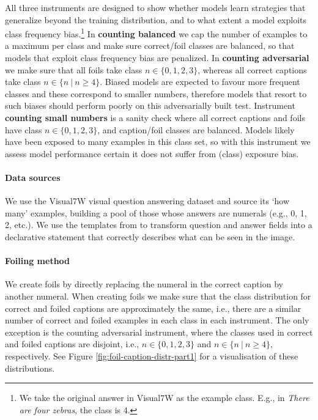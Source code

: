\documentclass[11pt]{article}
\newcommand\given[1][]{\:#1\vert\:}
\begin{document}
All three instruments are designed to show whether models learn strategies that generalize beyond the training distribution, and to what extent a model exploits class frequency bias.\footnote{We take the original answer in Visual7W as the example class. E.g., in \textit{There are four zebras}, the class is 4.}
In {\bf counting balanced} we cap the number of examples to a maximum per class and make sure correct/foil classes are balanced, so that models that exploit class frequency bias are penalized.
In {\bf counting adversarial} we make sure that all foils take class $n \in \{0,1,2,3\}$, whereas all correct captions take class $n \in \{n \given n \geq 4\}$. Biased models are expected to favour more frequent classes and these correspond to smaller numbers, therefore models that resort to such biases should perform poorly on this adversarially built test.
Instrument {\bf counting small numbers} is a sanity check where all correct captions and foils have class $n \in \{0,1,2,3\}$, and caption/foil classes are balanced. Models likely have been exposed to many examples in this class set, so with this instrument we assess model performance certain it does not suffer from (class) exposure bias.









\paragraph{Data sources}
We use the Visual7W visual question answering dataset \citep{zhu2016cvpr} and source its `how many' examples, building a pool of those whose answers are numerals (e.g., 0, 1, 2, etc.).
We use the templates from \citet{parcalabescu2021seeing} to transform question and answer fields into a declarative statement that correctly describes what can be seen in the image.




\paragraph{Foiling method}
We create foils by directly replacing the numeral in the correct caption by another numeral. When creating foils we make sure that the class distribution for correct and foiled captions are approximately the same, i.e., there are a similar number of correct and foiled examples in each class in each instrument.
The only exception is the counting adversarial instrument, where the classes used in correct and foiled captions are disjoint, i.e., $n \in \{0,1,2,3\}$ and $n \in \{n \given n \geq 4\}$, respectively.
See Figure \ref{fig:foil-caption-distr-part1} for a visualisation of these distributions.
\end{document}
